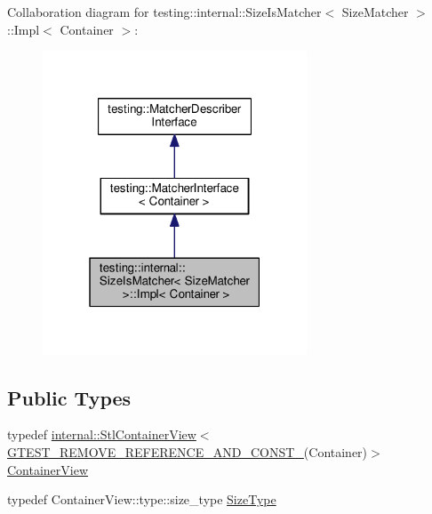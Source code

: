 Collaboration diagram for testing\+:\+:internal\+:\+:Size\+Is\+Matcher$<$ Size\+Matcher $>$\+:\+:Impl$<$ Container $>$\+:\nopagebreak
\begin{figure}[H]
\begin{center}
\leavevmode
\includegraphics[width=223pt]{classtesting_1_1internal_1_1SizeIsMatcher_1_1Impl__coll__graph}
\end{center}
\end{figure}
\subsection*{Public Types}
\begin{DoxyCompactItemize}
\item 
typedef \hyperlink{classtesting_1_1internal_1_1StlContainerView}{internal\+::\+Stl\+Container\+View}$<$ \hyperlink{gtest-internal_8h_a874567b176266188fabfffb8393267ce}{G\+T\+E\+S\+T\+\_\+\+R\+E\+M\+O\+V\+E\+\_\+\+R\+E\+F\+E\+R\+E\+N\+C\+E\+\_\+\+A\+N\+D\+\_\+\+C\+O\+N\+S\+T\+\_\+}(Container)$>$ \hyperlink{classtesting_1_1internal_1_1SizeIsMatcher_1_1Impl_ae848755998eaaaa5e38366a2fc8b55e2}{Container\+View}
\item 
typedef Container\+View\+::type\+::size\+\_\+type \hyperlink{classtesting_1_1internal_1_1SizeIsMatcher_1_1Impl_a5548da0c4c2245ca2fb520f44f0a687a}{Size\+Type}
\end{DoxyCompactItemize}

